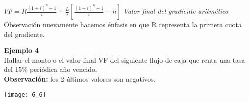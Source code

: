 	$VF = R\frac{(1+i)^n-1}{i} + \frac{L}{i}[\frac{(1+i)^n-1}{i}-n]$ \hspace{35 pt} \textit{Valor final del gradiente aritmético}\\
	
	\textrm{Observación} nuevamente hacemos énfasis en que R representa la primera cuota del gradiente.
	
	\textbf{Ejemplo 4}\\
	Hallar el monto o el valor final VF del siguiente flujo de caja que renta una tasa del 15\% periódica año vencido. \\
	\textbf{Observación:} los 2 últimos valores son negativos.\\
	\begin{center}
		\texttt{[image: 6\_6]}
	\end{center}
	

